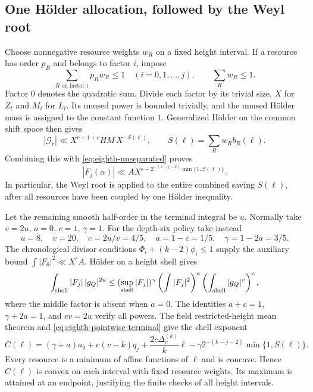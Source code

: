 \documentclass[11pt,reqno]{amsart}
\numberwithin{equation}{section}
\theoremstyle{definition}
\begin{document}
\subsection{One H\"older allocation, followed by the Weyl root}

Choose nonnegative resource weights $w_R$ on a fixed height interval.
If a resource has order $p_R$ and belongs to factor $i$, impose
\[
 \sum_{R\text{ on factor }i}p_Rw_R\le1
       \quad(i=0,1,\ldots,j),\qquad \sum_R w_R\le1.
\]
Factor $0$ denotes the quadratic sum. Divide each factor by its trivial
size, $X$ for $Z_t$ and $M_i$ for $L_i$. Its unused power is bounded
trivially, and the unused H\"older mass is assigned to the constant
function $1$. Generalized H\"older on the common shift space then gives
\[
 |\mathcal G_r|\ll X^{r+1+\epsilon}HM\,X^{-S(\ell)},\qquad
 S(\ell)=\sum_Rw_Rb_R(\ell).
\]
Combining this with \eqref{eq:eighth-unseparated} proves
\begin{equation}\label{eq:eighth-pointwise-terminal}
 |F_j(\alpha)|\ll A X^{\epsilon-
               2^{-(k-j-2)}\min\{1,S(\ell)\}}.
\end{equation}
In particular, the Weyl root is applied to the entire combined saving
$S(\ell)$, after all resources have been coupled by one H\"older inequality.

Let the remaining smooth half-order in the terminal integral be $u$.
Normally take $v=2u$, $a=0$, $c=1$, $\gamma=1$.
For the depth-six policy take instead
\[
 u=8,\quad v=20,\quad c=2u/v=4/5,\quad
 a=1-c=1/5,\quad\gamma=1-2a=3/5.
\]
The chronological divisor conditions
$\Phi_i+(k-2)\phi_i\le1$ supply the auxiliary bound
$\int|F_6|^2\ll X^\epsilon A$.
H\"older on a height shell gives
\[
 \int_{\rm shell}|F_j|\,|g_Q|^{2u}
 \le (\sup_{\rm shell}|F_j|)^\gamma
      \left(\int|F_j|^2\right)^a
      \left(\int_{\rm shell}|g_Q|^v\right)^c,
\]
where the middle factor is absent when $a=0$.
The identities $a+c=1$, $\gamma+2a=1$, and $cv=2u$ verify all powers.
The field restricted-height mean theorem and
\eqref{eq:eighth-pointwise-terminal} give the shell exponent
\begin{equation}\label{eq:eighth-shell-exponent}
 C(\ell)=(\gamma+a)a_0+c(v-k)q_j+
             \frac{2c\Delta_v^{(k)}}{k}\ell
       -\gamma 2^{-(k-j-2)}\min\{1,S(\ell)\}.
\end{equation}
Every resource is a minimum of affine functions of $\ell$ and is concave.
Hence $C(\ell)$ is convex on each interval with fixed resource weights.
Its maximum is attained at an endpoint, justifying the finite checks of
all height intervals.
\end{document}
